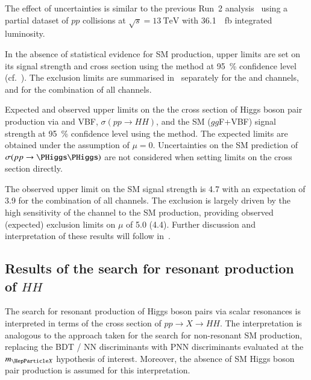  The effect of uncertainties is similar
to the previous Run~2 analysis~\cite{HIGG-2016-16-witherratum} using a
partial dataset of $pp$ collisions at $\sqrt{s} = \SI{13}{\TeV}$ with
\SI{36.1}{\per\femto\barn} integrated luminosity.

In the absence of statistical evidence for SM \HH production, upper
limits are set on its signal strength and cross section using the \CLs
method at \SI{95}{\percent} confidence level (cf.\
). The exclusion limits are summarised
in~\Cref{tab:limits_non_resonant} separately for the \lephad and
\hadhad channels, and for the combination of all channels.

\begin{table}[htbp]
  \centering

  \caption{Expected and observed upper limits on the the cross section
    of Higgs boson pair production via \ggF and VBF,
    $\sigma(pp \to HH)$, and the SM \HH ($gg$F+VBF) signal strength at
    \SI{95}{\percent} confidence level using the \CLs method. The
    expected limits are obtained under the assumption of $\mu =
    0$. Uncertainties on the SM prediction of $\sigma(pp \to \HH)$ are
    not considered when setting limits on the cross section
    directly.}%
  \label{tab:limits_non_resonant}

  
\end{table}

The observed upper limit on the SM \HH signal strength is \num{4.7}
with an expectation of \num{3.9} for the combination of all channels.
The exclusion is largely driven by the high sensitivity of the \hadhad
channel to the SM \HH production, providing observed (expected)
exclusion limits on $\mu$ of \num{5.0} (\num{4.4}). Further discussion
and interpretation of these results will follow
in~.


\subsection{Results of the search for resonant production of $HH$}
\label{sec:results_res}

The search for resonant production of Higgs boson pairs via scalar
resonances is interpreted in terms of the cross section of
$pp \to X \to HH$. The interpretation is analogous to the approach
taken for the search for non-resonant SM \HH production, replacing the
BDT / NN discriminants with PNN discriminants evaluated at the $\mX$
hypothesis of interest. Moreover, the absence of SM Higgs boson pair
production is assumed for this interpretation.


